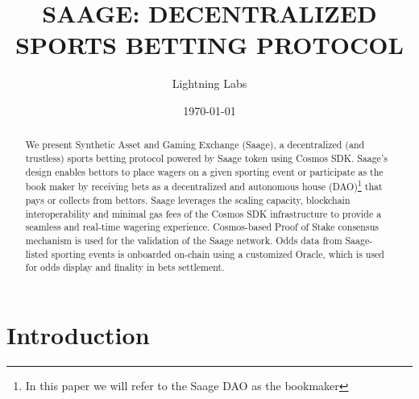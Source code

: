 \documentclass[%
 aapm,
 mph,%
 amsmath,amssymb,
 reprint,%
]{revtex4-2}
\begin{document}

\title[SAAGE]{SAAGE: DECENTRALIZED SPORTS BETTING PROTOCOL}%

\author{Lightning Labs}
%

\date{\today}%

\begin{abstract}
We present Synthetic Asset and Gaming Exchange (Saage), a decentralized (and trustless) sports betting protocol powered by Saage token using Cosmos SDK. Saage’s design enables bettors to place wagers on a given sporting event or participate as the book maker by receiving bets as a decentralized and autonomous house (DAO)\footnote{In this paper we will refer to the Saage DAO as the bookmaker} that pays or collects from bettors. Saage leverages the scaling capacity, blockchain interoperability and minimal gas fees of the Cosmos SDK infrastructure to provide a seamless and real-time wagering experience. Cosmos-based Proof of Stake consensus mechanism is used for the validation of the Saage network. Odds data from Saage-listed sporting events is onboarded on-chain using a customized Oracle, which is used for odds display and finality in bets settlement.

%
\end{abstract}


\maketitle


\section{Introduction}
\end{document}
